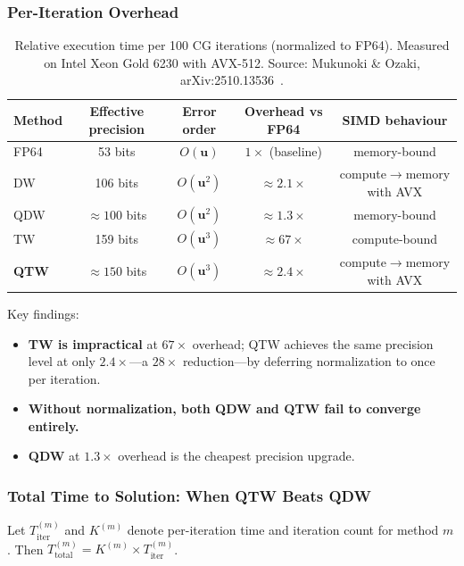 \documentclass[12pt,a4paper]{article}
\newcommand{\uu}{\mathbf{u}}
\begin{document}
\subsubsection{Per-Iteration Overhead}

\begin{table}[H]
\centering
\caption{Relative execution time per 100 CG iterations (normalized to FP64).
         Measured on Intel Xeon Gold 6230 with AVX-512.
         Source: Mukunoki \& Ozaki, arXiv:2510.13536~\cite{Mukunoki2025}.}
\begin{tabular}{lcccc}
\toprule
\textbf{Method} & \textbf{Effective precision} & \textbf{Error order}
               & \textbf{Overhead vs FP64} & \textbf{SIMD behaviour} \\
\midrule
FP64  & 53 bits        & $O(\uu)$    & $1\times$ (baseline) & memory-bound \\
DW    & 106 bits       & $O(\uu^2)$  & $\approx 2.1\times$  & compute$\to$memory with AVX \\
QDW   & $\approx 100$ bits & $O(\uu^2)$ & $\approx 1.3\times$ & memory-bound \\
TW    & 159 bits       & $O(\uu^3)$  & $\approx 67\times$   & compute-bound \\
\textbf{QTW} & $\approx 150$ bits & $O(\uu^3)$ & $\approx 2.4\times$ & compute$\to$memory with AVX \\
\bottomrule
\end{tabular}
\end{table}

Key findings:
\begin{itemize}
  \item \textbf{TW is impractical} at $67\times$ overhead; QTW achieves the same
        precision level at only $2.4\times$---a $28\times$ reduction---by
        deferring normalization to once per iteration.
  \item \textbf{Without normalization, both QDW and QTW fail to converge entirely.}
  \item \textbf{QDW} at $1.3\times$ overhead is the cheapest precision upgrade.
\end{itemize}

\subsubsection{Total Time to Solution: When QTW Beats QDW}

Let $T_{\mathrm{iter}}^{(m)}$ and $K^{(m)}$ denote per-iteration time and
iteration count for method $m$. Then $T_{\mathrm{total}}^{(m)} = K^{(m)} \times T_{\mathrm{iter}}^{(m)}$.
\end{document}

